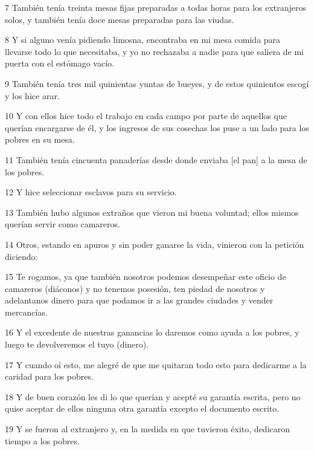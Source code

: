 \par 7 También tenía treinta mesas fijas preparadas a todas horas para los extranjeros solos, y también tenía doce mesas preparadas para las viudas.

\par 8 Y si alguno venía pidiendo limosna, encontraba en mi mesa comida para llevarse todo lo que necesitaba, y yo no rechazaba a nadie para que saliera de mi puerta con el estómago vacío.

\par 9 También tenía tres mil quinientas yuntas de bueyes, y de estos quinientos escogí y los hice arar.

\par 10 Y con ellos hice todo el trabajo en cada campo por parte de aquellos que querían encargarse de él, y los ingresos de sus cosechas los puse a un lado para los pobres en su mesa.

\par 11 También tenía cincuenta panaderías desde donde enviaba [el pan] a la mesa de los pobres.

\par 12 Y hice seleccionar esclavos para su servicio.

\par 13 También hubo algunos extraños que vieron mi buena voluntad; ellos mismos querían servir como camareros.

\par 14 Otros, estando en apuros y sin poder ganarse la vida, vinieron con la petición diciendo:

\par 15 Te rogamos, ya que también nosotros podemos desempeñar este oficio de camareros (diáconos) y no tenemos posesión, ten piedad de nosotros y adelantanos dinero para que podamos ir a las grandes ciudades y vender mercancías.

\par 16 Y el excedente de nuestras ganancias lo daremos como ayuda a los pobres, y luego te devolveremos el tuyo (dinero).

\par 17 Y cuando oí esto, me alegré de que me quitaran todo esto para dedicarme a la caridad para los pobres.

\par 18 Y de buen corazón les di lo que querían y acepté su garantía escrita, pero no quise aceptar de ellos ninguna otra garantía excepto el documento escrito.

\par 19 Y se fueron al extranjero y, en la medida en que tuvieron éxito, dedicaron tiempo a los pobres.


